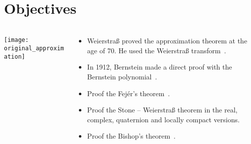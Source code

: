 \section{Objectives}

\begin{frame}
	\frametitle{\secname}
	\begin{columns}
		\begin{column}{0.38\textwidth}
			\texttt{[image: original\_approximation]}
		\end{column}
		\begin{column}{0.58\textwidth}
			\begin{itemize}
				\item

				      Weierstraß proved the \alert{approximation theorem} at
				      the age of 70.
				      He used the \alert{Weierstraß transform}~\cite{
					      weierstrass1885,
					      Schep2007
				      }.


				\item

				      In 1912, Bernstein made a direct proof with the
				      \alert{Bernstein polynomial}~\cite{Saha2021}.

				\item

				      Proof the \alert{Fejér's theorem}~\cite{Fejér1903}.

				\item

				      Proof the \alert{Stone – Weierstraß theorem} in the
				      real, complex, quaternion and locally compact versions.

				\item

				      Proof the \alert{Bishop's theorem}~\cite{Rudin1991}.
			\end{itemize}
		\end{column}
	\end{columns}

\end{frame}